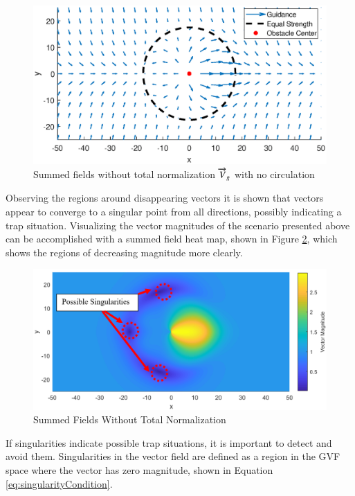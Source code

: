 \documentclass[numbered,pdftex]{ohio-etd}
\begin{document}
\begin{figure}[H]
	\centering
	\includegraphics[trim=25 35 25 50,clip,width=14cm]{PaperFigures/Methods/summedFieldsNoNorm}
	\caption{Summed fields without total normalization $\protect \overrightarrow{V}_g$ with no circulation}
	\label{fig:summedFieldsNoNorm}
\end{figure}

Observing the regions around disappearing vectors it is shown that vectors appear to converge to a singular point from all directions, possibly indicating a trap situation. Visualizing the vector magnitudes of the scenario presented above can be accomplished with a summed field heat map, shown in Figure \ref{fig:summedHeatMap}, which shows the regions of decreasing magnitude more clearly. 


\begin{figure}[H]
	\centering
	\includegraphics[trim=0 0 0 0,clip,width=14cm]{Figures/methods/summedHeatMapSimple2}
	\caption{Summed Fields Without Total Normalization}
	\label{fig:summedHeatMap}
\end{figure}

If singularities indicate possible trap situations, it is important to detect and avoid them. Singularities in the vector field are defined as a region in the GVF space where the vector has zero magnitude, shown in Equation \ref{eq:singularityCondition}.
\end{document}
